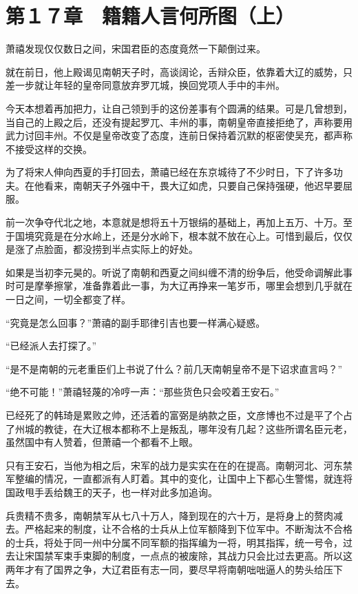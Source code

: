 \section{第１７章　籍籍人言何所图（上）}

萧禧发现仅仅数日之间，宋国君臣的态度竟然一下颠倒过来。

就在前日，他上殿谒见南朝天子时，高谈阔论，舌辩众臣，依靠着大辽的威势，只差一步就让年轻的皇帝同意放弃罗兀城，换回党项人手中的丰州。

今天本想着再加把力，让自己领到手的这份差事有个圆满的结果。可是几曾想到，当自己的上殿之后，还没有提起罗兀、丰州的事，南朝皇帝直接拒绝了，声称要用武力讨回丰州。不仅是皇帝改变了态度，连前日保持着沉默的枢密使吴充，都声称不接受这样的交换。

为了将宋人伸向西夏的手打回去，萧禧已经在东京城待了不少时日，下了许多功夫。在他看来，南朝天子外强中干，畏大辽如虎，只要自己保持强硬，他迟早要屈服。

前一次争夺代北之地，本意就是想将五十万银绢的基础上，再加上五万、十万。至于国境究竟是在分水岭上，还是分水岭下，根本就不放在心上。可惜到最后，仅仅是涨了点脸面，都没捞到半点实际上的好处。

如果是当初李元昊的。听说了南朝和西夏之间纠缠不清的纷争后，他受命调解此事时可是摩拳擦掌，准备靠着此一事，为大辽再挣来一笔岁币，哪里会想到几乎就在一日之间，一切全都变了样。

“究竟是怎么回事？”萧禧的副手耶律引吉也要一样满心疑惑。

“已经派人去打探了。”

“是不是南朝的元老重臣们上书说了什么？前几天南朝皇帝不是下诏求直言吗？”

“绝不可能！”萧禧轻蔑的冷哼一声：“那些货色只会咬着王安石。”

已经死了的韩琦是累败之帅，还活着的富弼是纳款之臣，文彦博也不过是平了个占了州城的教徒，在大辽根本都称不上是叛乱，哪年没有几起？这些所谓名臣元老，虽然国中有人赞着，但萧禧一个都看不上眼。

只有王安石，当他为相之后，宋军的战力是实实在在的在提高。南朝河北、河东禁军整编的情况，一直都派有人盯着。其中的变化，让国中上下都心生警惕，就连将国政甩手丢给魏王的天子，也一样对此多加追询。

兵贵精不贵多，南朝禁军从七八十万人，降到现在的六十万，是将身上的赘肉减去。严格起来的制度，让不合格的士兵从上位军额降到下位军中。不断淘汰不合格的士兵，将处于同一州中分属不同军额的指挥编为一将，明其指挥，统一号令，过去让宋国禁军束手束脚的制度，一点点的被废除，其战力只会比过去更高。所以这两年才有了国界之争，大辽君臣有志一同，要尽早将南朝咄咄逼人的势头给压下去。

